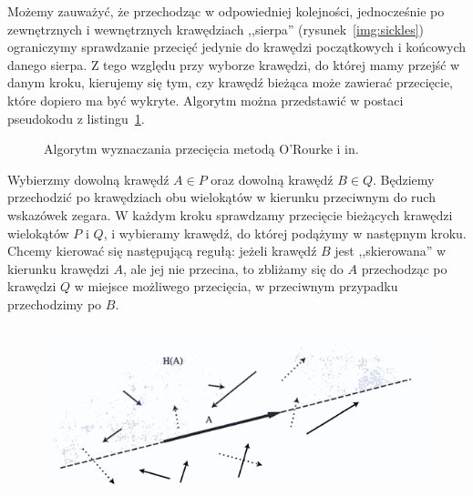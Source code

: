 Możemy zauważyć, że przechodząc w odpowiedniej kolejności,
jednocześnie po zewnętrznych i wewnętrznych krawędziach ,,sierpa''
(rysunek~\ref{img:sickles}) ograniczymy sprawdzanie przecięć jedynie
do krawędzi początkowych i końcowych danego sierpa. Z tego względu
przy wyborze krawędzi, do której mamy przejść w danym kroku, kierujemy
się tym, czy krawędź bieżąca może zawierać przecięcie, które dopiero
ma być wykryte. Algorytm można przedstawić w postaci pseudokodu z
listingu~\ref{alg:Orourke98}.

\begin{figure}[htp]

  \begin{algorithmic}[1]


    \Repeat

    \EndProcedure
  \end{algorithmic}
  \caption{Algorytm wyznaczania przecięcia metodą O'Rourke i
    in.\label{alg:Orourke98}}
\end{figure}

Wybierzmy dowolną krawędź $A \in P$ oraz dowolną krawędź $B \in
Q$. Będziemy przechodzić po krawędziach obu wielokątów w kierunku
przeciwnym do ruch wskazówek zegara. W każdym kroku sprawdzamy
przecięcie bieżących krawędzi wielokątów $P$ i $Q$, i wybieramy
krawędź, do której podążymy w następnym kroku.  Chcemy kierować się
następującą regułą: jeżeli krawędź $B$ jest ,,skierowana'' w kierunku
krawędzi $A$, ale jej nie przecina, to zbliżamy się do $A$ przechodząc
po krawędzi $Q$ w miejsce możliwego przecięcia, w przeciwnym przypadku
przechodzimy po $B$.

\begin{figure}[htb]
  \centering
  \includegraphics[scale=0.7]{img/vectors}
  \caption{\label{img:advance}}
\end{figure}

